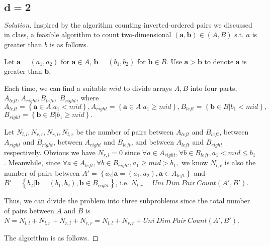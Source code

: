 \documentclass{article}
\newenvironment{solution}{\begin{proof}[\noindent\it Solution]}{\end{proof}}
\begin{document}
\vspace{.5em}

\subsection{$\boldsymbol{d=2}$}
\vspace{1em}
\begin{solution}
    Inspired by the algorithm counting inverted-ordered pairs we discussed in class, a feasible algorithm to count two-dimensional $\boldsymbol{(a,b)}\in(A,B)$ s.t. $a$ is greater than $b$ is as follows.
    
    \hspace{2.5em} Let $\boldsymbol{a}=(a_1,a_2)$ for $\boldsymbol{a}\in A$, $\boldsymbol{b}=(b_1,b_2)$ for $\boldsymbol{b}\in B$. Use $\boldsymbol{a>b}$ to denote  $\boldsymbol{a}$ is greater than $\boldsymbol{b}$.
    
    \hspace{2.5em}
    Each time, we can find a suitable $mid$ to divide arrays $A,B$ into four parts, $A_{left}, A_{right},B_{left},$ $B_{right}$, where $A_{left}=\left\{\boldsymbol{a}\in A\big|a_1<mid\right\}, A_{right}=\left\{\boldsymbol{a}\in A\big|a_1\geq mid\right\}, B_{left}=\left\{\boldsymbol{b}\in B\big|b_1<mid\right\},$ $B_{right}=\left\{\boldsymbol{b}\in B\big|b_1\geq mid\right\}.$ 
    
    \hspace{2.5em}
    Let $N_{l,l},N_{r,r},N_{r,l},N_{l,r}$ be the number of pairs between $A_{left}$ and $B_{left}$, between $A_{right}$ and $B_{right}$, between $A_{right}$ and $B_{left}$, and between $A_{left}$ and $B_{right}$ respectively. Obvious we have $N_{r,l}=0$ since $\forall a\in A_{right}, \forall b\in B_{left}, a_1<mid\le b_1$. Meanwhile, since $\forall a\in A_{left},\forall b\in B_{right}, a_1\geq mid>b_1,$ we know $N_{l,r}$ is also the number of pairs between $A'=\left\{a_2\big|\boldsymbol{a}=(a_1,a_2),\boldsymbol{a}\in A_{left}\right\}$ and $B'=\left\{b_2\big|\boldsymbol{b}=(b_1,b_2),\boldsymbol{b}\in B_{right}\right\}$, i.e. $N_{l,r}=Uni\ Dim\ Pair\ Count(A',B')$.
    
    \hspace{2.5em}
    Thus, we can divide the problem into three subproblems since the total number of pairs between $A$ and $B$ is $N=N_{l,l}+N_{l,r}+N_{r,l}+N_{r,r}=N_{l,l}+N_{r,r}+Uni\ Dim\ Pair\ Count(A',B')$.
    
    \hspace{2.5em}
    The algorithm is as follows.
    

\end{solution}
\end{document}
